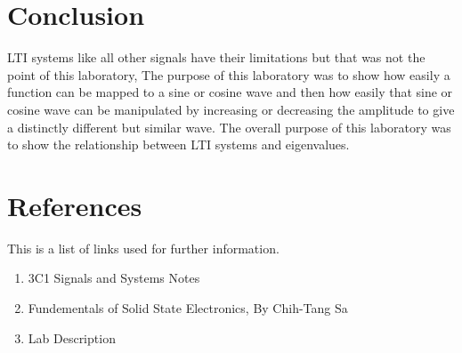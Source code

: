 \documentclass{article}
\begin{document}
\pagebreak

\section{Conclusion}
LTI systems like all other signals have their limitations but that was not the point of this laboratory, The purpose of this laboratory was to show how easily a function can be mapped to a sine or cosine wave and then how easily that sine or cosine wave can be manipulated by increasing or decreasing the amplitude to give a distinctly different but similar wave. The overall purpose of this laboratory was to show the relationship between LTI systems and eigenvalues.
\\
	
	



\appendix
\section{References}
This is a list of links used for further information.

	\begin{enumerate}
	
	\item 3C1 Signals and Systems Notes
	\item Fundementals of Solid State Electronics, By Chih-Tang Sa
	\item Lab Description
	\end{enumerate}
\end{document}
